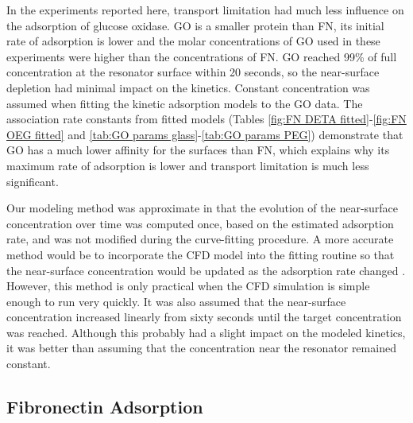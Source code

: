 In the experiments reported here, transport limitation had much less
influence on the adsorption of glucose oxidase. GO is a smaller protein
than FN, its initial rate of adsorption is lower and the molar concentrations
of GO used in these experiments were higher than the concentrations
of FN. GO reached 99\% of full concentration at the resonator surface
within 20 seconds, so the near-surface depletion had minimal impact
on the kinetics. Constant concentration was assumed when fitting the
kinetic adsorption models to the GO data. The association rate constants
from fitted models (Tables \ref{fig:FN DETA fitted}-\ref{fig:FN OEG fitted}
and \ref{tab:GO params glass}-\ref{tab:GO params PEG}) demonstrate
that GO has a much lower affinity for the surfaces than FN, which
explains why its maximum rate of adsorption is lower and transport
limitation is much less significant.

Our modeling method was approximate in that the evolution of the near-surface
concentration over time was computed once, based on the estimated
adsorption rate, and was not modified during the curve-fitting procedure.
A more accurate method would be to incorporate the CFD model into
the fitting routine so that the near-surface concentration would be
updated as the adsorption rate changed \cite{Jenkins2004}. However,
this method is only practical when the CFD simulation is simple enough
to run very quickly. It was also assumed that the near-surface concentration
increased linearly from sixty seconds until the target concentration
was reached. Although this probably had a slight impact on the modeled
kinetics, it was better than assuming that the concentration near
the resonator remained constant.


\subsection{Fibronectin Adsorption}


